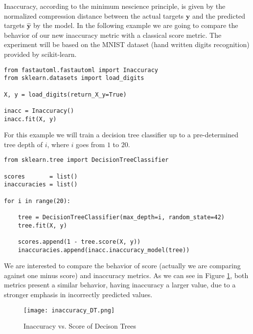 \begin{example}
\label{ex:machine_learning:inaccuracy:inaccuracy_DT}
Inaccuracy, according to the minimum nescience principle, is given by the normalized compression distance between the actual targets $\mathbf{y}$ and the predicted targets $\mathbf{\hat{y}}$ by the model. In the following example we are going to compare the behavior of our new inaccuracy metric with a classical score metric. The experiment will be based on the MNIST dataset (hand written digits recognition) provided by scikit-learn.

\begin{sourcecode}
{\scriptsize \begin{verbatim}
from fastautoml.fastautoml import Inaccuracy
from sklearn.datasets import load_digits

X, y = load_digits(return_X_y=True)

inacc = Inaccuracy()
inacc.fit(X, y)
\end{verbatim}}
\end{sourcecode}

For this example we will train a decision tree classifier up to a pre-determined tree depth of $i$, where $i$ goes from $1$ to $20$.

\begin{sourcecode}
{\scriptsize \begin{verbatim}
from sklearn.tree import DecisionTreeClassifier

scores       = list()
inaccuracies = list()

for i in range(20):
    
    tree = DecisionTreeClassifier(max_depth=i, random_state=42)
    tree.fit(X, y)
    
    scores.append(1 - tree.score(X, y))
    inaccuracies.append(inacc.inaccuracy_model(tree))
\end{verbatim}}
\end{sourcecode}

We are interested to compare the behavior of score (actually we are comparing against one minus score) and inaccuracy metrics. As we can see in Figure \ref{figure:machine_learning:inaccuracy:inaccuracy_DT}, both metrics present a similar behavior, having inaccuracy a larger value, due to a stronger emphasis in incorrectly predicted values.

\begin{figure}[h]
\centering
\texttt{[image: inaccuracy\_DT.png]}
\caption{Inaccuracy vs. Score of Decison Trees}
\label{figure:machine_learning:inaccuracy:inaccuracy_DT}
\end{figure}

\end{example}

